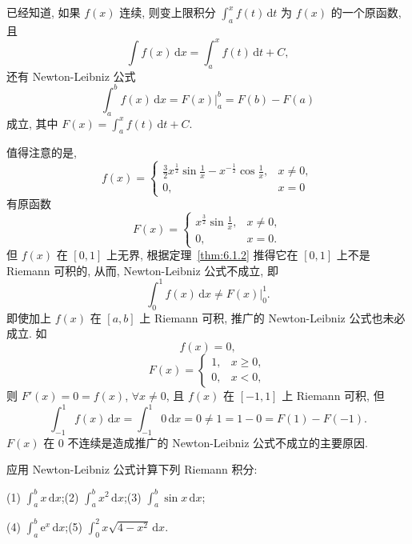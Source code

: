 \begin{example}\label{ex:6.3.1}
已经知道, 如果 $f(x)$ 连续, 则变上限积分 $\int_{a}^{x}f(t)\,\mathrm{d}t$ 为 $f(x)$ 的一个原函数, 且
\[
\int f(x)\,\mathrm{d}x=\int_{a}^{x}f(t)\,\mathrm{d}t+C,
\]
还有 Newton-Leibniz 公式
\[
\int_{a}^{b}f(x)\,\mathrm{d}x=F(x)\Big|_{a}^{b}=F(b)-F(a)
\]
成立, 其中 $F(x)=\int_{a}^{x}f(t)\,\mathrm{d}t+C$.

值得注意的是,
\[
f(x)=\begin{cases}\frac{3}{2}x^{\frac{1}{2}}\sin\frac{1}{x}-x^{-\frac{1}{2}}\cos\frac{1}{x},&x\neq 0,\\0,&x=0\end{cases}
\]
有原函数
\[
F(x)=\begin{cases}x^{\frac{3}{2}}\sin\frac{1}{x},&x\neq 0,\\0,&x=0.\end{cases}
\]
但 $f(x)$ 在 $[0,1]$ 上无界, 根据定理~\ref{thm:6.1.2} 推得它在 $[0,1]$ 上不是 Riemann 可积的, 从而, Newton-Leibniz 公式不成立, 即
\[
\int_{0}^{1}f(x)\,\mathrm{d}x\neq F(x)\Big|_{0}^{1}.
\]
即使加上 $f(x)$ 在 $[a,b]$ 上 Riemann 可积, 推广的 Newton-Leibniz 公式也未必成立. 如
\[
f(x)=0,
\]
\[
F(x)=\begin{cases}1,&x\geqslant 0,\\0,&x<0,\end{cases}
\]
则 $F'(x)=0=f(x)$, $\forall x\neq 0$, 且 $f(x)$ 在 $[-1,1]$ 上 Riemann 可积, 但
\[
\int_{-1}^{1}f(x)\,\mathrm{d}x=\int_{-1}^{1}0\,\mathrm{d}x=0\neq 1=1-0=F(1)-F(-1).
\]
$F(x)$ 在 $0$ 不连续是造成推广的 Newton-Leibniz 公式不成立的主要原因.
\end{example}

\begin{example}\label{ex:6.3.2}
应用 Newton-Leibniz 公式计算下列 Riemann 积分:

(1) $\int_{a}^{b}x\,\mathrm{d}x$;\qquad (2) $\int_{a}^{b}x^{2}\,\mathrm{d}x$;\qquad (3) $\int_{a}^{b}\sin x\,\mathrm{d}x$;

(4) $\int_{a}^{b}\mathrm{e}^{x}\,\mathrm{d}x$;\qquad (5) $\int_{0}^{2}x\sqrt{4-x^{2}}\,\mathrm{d}x$.
\end{example}

